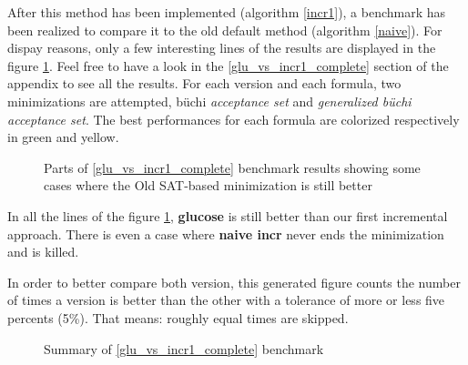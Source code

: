 \noindent After this method has been implemented (algorithm \ref{incr1}), a benchmark has been realized to
compare it to the old default method (algorithm \ref{naive}). For dispay reasons, only a few interesting
lines of the results are displayed in the figure \ref{fig:glu_vs_incr1_short}. Feel free to have a look
in the \ref{glu_vs_incr1_complete} section of the appendix to see all the results. For each version and
each formula, two minimizations are attempted, büchi \textit{acceptance set} and
\textit{generalized büchi acceptance set}. The best performances for each formula are colorized
respectively in green and yellow.

\begin{figure}[H]
 \centering
 \fontsize{9}{11}
 \caption{Parts of \ref{glu_vs_incr1_complete} benchmark results showing some cases where the Old SAT-based
          minimization is still better}
 \label{fig:glu_vs_incr1_short}
\end{figure}

In all the lines of the figure \ref{fig:glu_vs_incr1_short}, \textbf{glucose} is still better than our first
incremental approach. There is even a case where \textbf{naive incr} never ends the minimization and
is killed.

In order to better compare both version, this generated figure counts the number of times a version is
better than the other with a tolerance of more or less five percents (5\%). That means: roughly equal times
are skipped.
\begin{figure}[H]
 \centering
 
 \caption{Summary of \ref{glu_vs_incr1_complete} benchmark}
 \label{fig:glu_vs_incr1_resume}
\end{figure}

